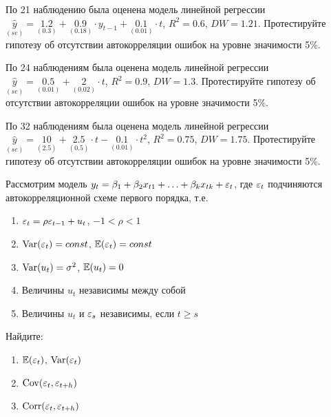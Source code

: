 \documentclass[pdftex,11pt,openany]{book}\usepackage[]{graphicx}\usepackage[]{color}
\begin{document}
\begin{solution}
\end{solution}


\begin{problem}
По 21 наблюдению была оценена модель линейной регрессии
$\underset{(se)}{\hat{y}}=\underset{(0.3)}{1.2}+\underset{(0.18)}{0.9}\cdot y_{t-1}+\underset{(0.01)}{0.1}\cdot t$, $R^2=0.6$, $DW=1.21$. Протестируйте гипотезу об отсутствии автокорреляции ошибок на уровне значимости 5\%.
\end{problem}

\begin{solution}
\end{solution}



\begin{problem}
По 24 наблюдениям была оценена модель линейной регрессии
$\underset{(se)}{\hat{y}}=\underset{(0.01)}{0.5}+\underset{(0.02)}{2}\cdot t$, $R^2=0.9$, $DW=1.3$. Протестируйте гипотезу об отсутствии автокорреляции ошибок на уровне значимости 5\%.
\end{problem}

\begin{solution}
\end{solution}


\begin{problem}
По 32 наблюдениям была оценена модель линейной регрессии
$\underset{(se)}{\hat{y}}=\underset{(2.5)}{10}+\underset{(0.5)}{2.5}\cdot t- \underset{(0.01)}{0.1}\cdot t^2$, $R^2=0.75$, $DW=1.75$. Протестируйте гипотезу об отсутствии автокорреляции ошибок на уровне значимости 5\%.
\end{problem}

\begin{solution}
\end{solution}


\begin{problem}
Рассмотрим модель $y_t=\beta_1+\beta_2 x_{t1}+\ldots+\beta_k x_{tk}+\varepsilon_t$, где $\varepsilon_t$ подчиняются автокорреляционной схеме первого порядка, т.е.
\begin{enumerate}
\item $\varepsilon_t=\rho \varepsilon_{t-1}+u_t$, $-1<\rho<1$
\item $\operatorname{Var}(\varepsilon_t)=const$, $\mathbb{E}(\varepsilon_t)=const$
\item $\operatorname{Var}(u_t)=\sigma^2$, $\mathbb{E}(u_t)=0$
\item Величины $u_t$ независимы между собой
\item Величины $u_t$ и $\varepsilon_s$ независимы, если $t\geq s$
\end{enumerate}
Найдите:
\begin{enumerate}
\item $\mathbb{E}(\varepsilon_t)$, $\operatorname{Var}(\varepsilon_t)$
\item $\operatorname{Cov}(\varepsilon_t,\varepsilon_{t+h})$
\item $\operatorname{Corr}(\varepsilon_t,\varepsilon_{t+h})$
\end{enumerate}
\end{problem}
\end{document}
